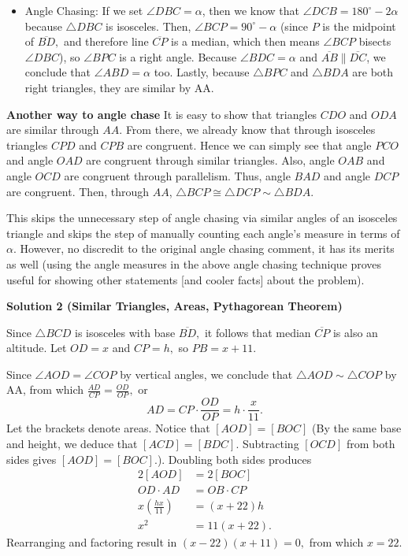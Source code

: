 \begin{enumerate}
 
            \begin{itemize}
        \item Angle Chasing: If we set $\angle DBC = \alpha$, then we know that $\angle DCB = 180^\circ-2\alpha$ because $\triangle DBC$ is isosceles. Then, $\angle BCP = 90^\circ-\alpha$ (since $P$ is the midpoint of $\overline{BD},$ and therefore line $\overline{CP}$ is a median, which then means $\angle BCP$ bisects $\angle DBC$), so $\angle BPC$ is a right angle. Because $\angle BDC = \alpha$ and $\overline{AB}\parallel\overline{DC}$, we conclude that $\angle ABD = \alpha$ too. Lastly, because $\triangle BPC$ and $\triangle BDA$ are both right triangles, they are similar by AA.
            \end{itemize}
            \textbf{Another way to angle chase} It is easy to show that triangles $CDO$ and $ODA$ are similar through $AA$. From there, we already know that through isosceles triangles $CPD$ and $CPB$ are congruent. Hence we can simply see that angle $PCO$ and angle $OAD$ are congruent through similar triangles. Also, angle $OAB$ and angle $OCD$ are congruent through parallelism. Thus, angle $BAD$ and angle $DCP$ are congruent. Then, through $AA$, $\triangle BCP \cong \triangle DCP \sim \triangle BDA$.

 This skips the unnecessary step of angle chasing via similar angles of an isosceles triangle and skips the step of manually counting each angle's measure in terms of $\alpha$. However, no discredit to the original angle chasing comment, it has its merits as well (using the angle measures in the above angle chasing technique proves useful for showing other statements [and cooler facts] about the problem).

 



\textbf{Solution 2 (Similar Triangles, Areas, Pythagorean Theorem)}

Since $\triangle BCD$ is isosceles with base $\overline{BD},$ it follows that median $\overline{CP}$ is also an altitude. Let $OD=x$ and $CP=h,$ so $PB=x+11.$

 Since $\angle AOD=\angle COP$ by vertical angles, we conclude that $\triangle AOD\sim\triangle COP$ by AA, from which $\frac{AD}{CP}=\frac{OD}{OP},$ or 
 \[AD=CP\cdot\frac{OD}{OP}=h\cdot\frac{x}{11}.\] Let the brackets denote areas. Notice that $[AOD]=[BOC]$ (By the same base and height, we deduce that $[ACD]=[BDC].$ Subtracting $[OCD]$ from both sides gives $[AOD]=[BOC].$). Doubling both sides produces
 \begin{align*} 2[AOD]&=2[BOC] \\ OD\cdot AD&=OB\cdot CP \\ x\left(\frac{hx}{11}\right)&=(x+22)h \\ x^2&=11(x+22). \end{align*}
Rearranging and factoring result in $(x-22)(x+11)=0,$ from which $x=22.$


\end{enumerate}
